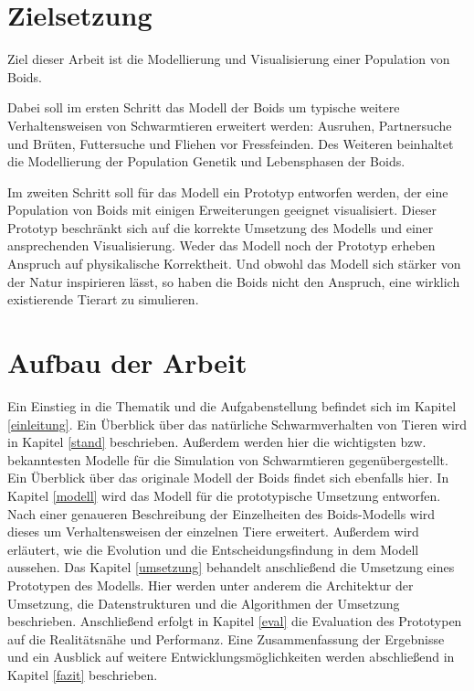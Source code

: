 \documentclass[draft=false
              ,paper=a4
              ,twoside=false
              ,fontsize=11pt
              ,headsepline
              ,BCOR10mm
              ,DIV11
              ,bibtotoc
              ,liststotoc
              ]{scrbook}
\begin{document}
\section{Zielsetzung}
Ziel dieser Arbeit ist die Modellierung und Visualisierung einer Population von Boids.

Dabei soll im ersten Schritt das Modell der Boids um typische weitere Verhaltensweisen von Schwarmtieren erweitert werden: Ausruhen, Partnersuche und Brüten, Futtersuche und Fliehen vor Fressfeinden.
Des Weiteren beinhaltet die Modellierung der Population Genetik und Lebensphasen der Boids.

Im zweiten Schritt soll für das Modell ein Prototyp entworfen werden, der eine Population von Boids mit einigen Erweiterungen geeignet visualisiert.
Dieser Prototyp beschränkt sich auf die korrekte Umsetzung des Modells und einer ansprechenden Visualisierung. Weder das Modell noch der Prototyp erheben Anspruch auf physikalische Korrektheit. Und obwohl das Modell sich stärker von der Natur inspirieren lässt, so haben die Boids nicht den Anspruch, eine wirklich existierende Tierart zu simulieren.

\section{Aufbau der Arbeit}
Ein Einstieg in die Thematik und die Aufgabenstellung befindet sich im Kapitel \ref{einleitung}.
\newline
Ein Überblick über das natürliche Schwarmverhalten von Tieren wird in Kapitel \ref{stand} beschrieben. Außerdem werden hier die wichtigsten bzw. bekanntesten Modelle für die Simulation von Schwarmtieren gegenübergestellt. Ein Überblick über das originale Modell der Boids findet sich ebenfalls hier.
\newline
In Kapitel \ref{modell} wird das Modell für die prototypische Umsetzung entworfen. Nach einer genaueren Beschreibung der Einzelheiten des Boids-Modells wird dieses um Verhaltensweisen der einzelnen Tiere erweitert. Außerdem wird erläutert, wie die Evolution und die Entscheidungsfindung in dem Modell aussehen.
\newline
Das Kapitel \ref{umsetzung} behandelt anschließend die Umsetzung eines Prototypen des Modells. Hier werden unter anderem die Architektur der Umsetzung, die Datenstrukturen und die Algorithmen der Umsetzung beschrieben.
\newline
Anschließend erfolgt in Kapitel \ref{eval} die Evaluation des Prototypen auf die Realitätsnähe und Performanz.
\newline
Eine Zusammenfassung der Ergebnisse und ein Ausblick auf weitere Entwicklungsmöglichkeiten werden abschließend in Kapitel \ref{fazit} beschrieben.
\end{document}
